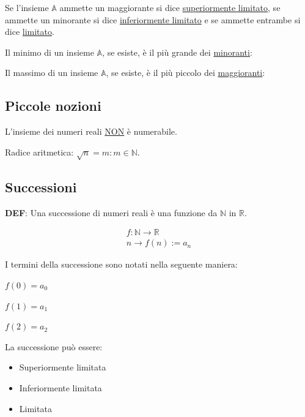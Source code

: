 \documentclass{article}
\begin{document}
\noindent
Se l'insieme $\mathbb{A}$ ammette un maggiorante si
dice \underline{superiormente limitato}, se ammette un minorante
si dice \underline{inferiormente limitato} e se ammette entrambe
si dice \underline{limitato}.

\vspace{5mm}
\noindent
Il minimo di un insieme $\mathbb{A}$, se esiste,
è il più grande dei \underline{minoranti}:

\vspace{5mm}
\noindent
Il massimo di un insieme $\mathbb{A}$, se esiste,
è il più piccolo dei \underline{maggioranti}:

\subsection{Piccole nozioni}

L'insieme dei numeri reali \underline{NON} è numerabile.

\vspace{5mm}
\noindent
Radice aritmetica: $\sqrt{n} = m : m \in \mathbb{N}$.

\subsection{Successioni}

\textbf{DEF}: Una successione di numeri reali è una funzione da
$\mathbb{N}$ in $\mathbb{R}$.

\begin{equation}
    \begin{split}
        f : \mathbb{N} \longrightarrow \mathbb{R} \\
        n \longrightarrow f(n) := a_n
    \end{split}
\end{equation}

\noindent
I termini della successione sono notati nella seguente maniera:

\vspace{5mm}
$f(0) = a_0$

\vspace{5mm}
$f(1) = a_1$

\vspace{5mm}
$f(2) = a_2$

\vspace{5mm}
\noindent
La successione può essere:

\begin{itemize}
    \item Superiormente limitata
    \item Inferiormente limitata
    \item Limitata
\end{itemize}
\end{document}
